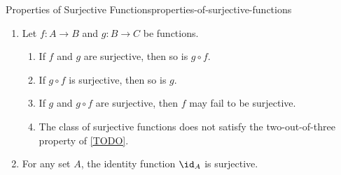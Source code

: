 \begin{proposition}{Properties of Surjective Functions}{properties-of-surjective-functions}
\begin{enumerate}
\begin{enumerate}
\begin{webcompile}
                    \end{webcompile}
                    In other words, we have
                    \[
                        \{%
                            b\in B%
                            \ \middle|\ %
                            f^{-1}(b)%
                            \subset%
                            f^{-1}(U)%
                        \}%
                        =%
                        U%
                    \]%
                    for each $U\in\mathcal{P}(B)$.%
            \end{enumerate}
        \item\label{properties-of-surjective-functions-interaction-with-composition}Let $f\colon A\to B$ and $g\colon B\to C$ be functions.
            \begin{enumerate}
                \item\label{properties-of-surjective-functions-interaction-with-composition-a}If $f$ and $g$ are surjective, then so is $g\circ f$.
                \item\label{properties-of-surjective-functions-interaction-with-composition-b}If $g\circ f$ is surjective, then so is $g$.
                \item\label{properties-of-surjective-functions-interaction-with-composition-c}If $g$ and $g\circ f$ are surjective, then $f$ may fail to be surjective.
                \item\label{properties-of-surjective-functions-interaction-with-composition-d}The class of surjective functions does not satisfy the two-out-of-three property of \cref{TODO}.
            \end{enumerate}
        \item\label{properties-of-surjective-functions-interaction-with-identities}For any set $A$, the identity function $\id_{A}$ is surjective.
    \end{enumerate}
\end{proposition}
